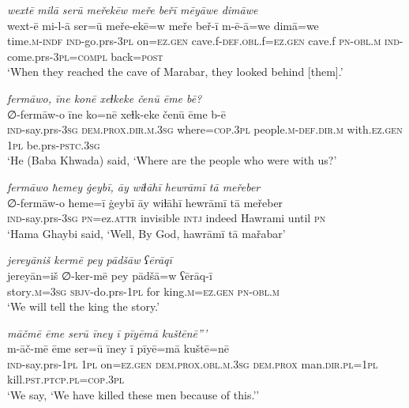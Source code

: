 \ea \label{BP.106}
\textit{wextē milā serū meřekēw meře beřī mēyāwe dimāwe} \\ 
\gll wext-ē mi-l-ā ser=ū meře-ekē=w meře beř-ī m-ē-ā=we dimā=we \\ 
 time\textsc{.m}\textsc{-indf} \textsc{ind-}go.prs\textsc{-3pl} on\textsc{=ez.gen} cave.f\textsc{-def}\textsc{.obl}.f\textsc{=ez.gen} cave.f \textsc{pn}\textsc{-obl}\textsc{.m} \textsc{ind-}come.prs\textsc{-3pl}\textsc{=compl} back\textsc{=\textsc{post}} \\ 
\glt `When they reached the cave of Marabar, they looked behind [them].'
\z 
 
\ea \label{BP.109}
\textit{fermāwo, īne konē xeɫkeke čenū ēme bē?} \\ 
\gll ∅-fermāw-o īne ko=nē xeɫk-eke čenū ēme b-ē \\ 
 \textsc{ind-}say.prs\textsc{-3sg} \textsc{dem.prox}\textsc{.dir}\textsc{.m}\textsc{.3sg} where\textsc{=cop}\textsc{.3pl} people\textsc{.m}\textsc{-def}\textsc{.dir}\textsc{.m} with\textsc{.ez.gen} \textsc{1pl} be.prs\textsc{-pstc}\textsc{.3sg} \\ 
\glt `He (Baba Khwada) said, ‘Where are the people who were with us?'
\z 
 
\ea \label{BP.113}
\textit{fermāwo ħemey ġeybī, āy wiɫāhī hewrāmī tā meřeber} \\ 
\gll ∅-fermāw-o ħeme=ī ġeybī āy wiɫāhī hewrāmī tā meřeber \\ 
 \textsc{ind-}say.prs\textsc{-3sg} \textsc{pn}=ez.\textsc{attr} invisible \textsc{intj} indeed Hawrami until \textsc{pn} \\ 
\glt `Hama Ghaybi said, ‘Well, By God, hawrāmī tā mařabar'
\z 
 
\ea \label{BP.120}
\textit{jereyāniš kermē pey pādšāw ʕērāqī} \\ 
\gll jereyān=iš ∅-ker-mē pey pādšā=w ʕērāq-ī \\ 
 story\textsc{.m}\textsc{=3sg} \textsc{sbjv-}do.prs\textsc{-\textsc{1pl}} for king\textsc{.m}\textsc{=ez.gen} \textsc{pn}\textsc{-obl}\textsc{.m} \\ 
\glt `We will tell the king the story.'
\z 
 
\ea \label{BP.121}
\textit{māčmē ēme serū īney ī pīyēmā kuštēnē”’} \\ 
\gll m-āč-mē ēme ser=ū īney ī pīyē=mā kuštē=nē \\ 
 \textsc{ind-}say.prs\textsc{-\textsc{1pl}} \textsc{1pl} on\textsc{=ez.gen} \textsc{dem.prox}\textsc{.obl}\textsc{.m}\textsc{.3sg} \textsc{dem.prox} man\textsc{.dir}\textsc{.pl}\textsc{=\textsc{1pl}} kill\textsc{.pst}\textsc{.ptcp}\textsc{.pl}\textsc{=cop}\textsc{.3pl} \\ 
\glt `We say, ‘We have killed these men because of this.’'
\z 
 
